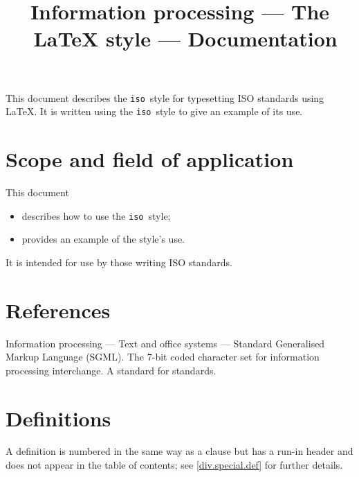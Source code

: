 

\title{Information processing --- The \iso\ LaTeX style --- Documentation}

\documenttype{}

\newcommand{\iso}{{\tt iso\/}}





\tableofcontents
\listoffigures
\listoftables
\maketitle

\introduction
\label{intro}
This document describes the \iso\ style for typesetting ISO standards using
LaTeX.
It is written using the \iso\ style to give an example of its use.

\section{Scope and field of application}
This document
\begin{itemize}
\item describes how to use the \iso\ style;
\item provides an example of the style's use.
\end{itemize}

It is intended for use by those writing ISO standards.

\section{References}
\label{references}
\begin{references}
 Information processing ---
    Text and office systems --- Standard
    Generalised Markup Language (SGML).
 The 7-bit coded character set for information
    processing interchange.
 A standard for standards.
\end{references}

\section{Definitions}
\label{definitions}
\label{def.def}
A definition is numbered in the same way as a clause but has a run-in
header and does not appear in the table of contents; see
\ref{div.special.def} for further details.

